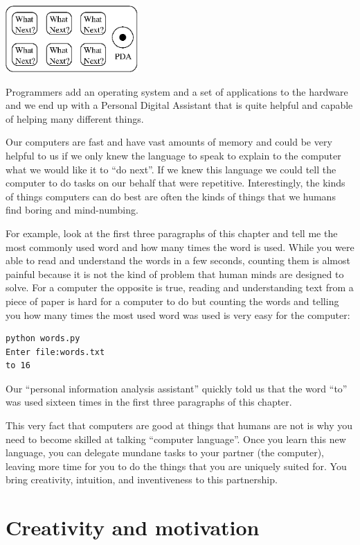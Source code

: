 \documentclass[11pt]{book}
\begin{document}
\beforefig
\centerline{\includegraphics[height=1.00in]{figs2/pda.eps}}
\afterfig

Programmers add an operating system and a set of applications
to the hardware and we end up with a Personal Digital
Assistant that is quite helpful and capable of helping
many different things.

Our computers are fast and have vast amounts of memory and 
could be very helpful to us if we only knew the language to
speak to explain to the computer what we would like it to 
``do next''.  If we knew this language we could tell the 
computer to do tasks on our behalf that were repetitive.  
Interestingly, the kinds of things computers can do best
are often the kinds of things that we humans find boring
and mind-numbing.

For example, look at the first three paragraphs of this
chapter and tell me the most commonly used word and how
many times the word is used.  While you were able to read
and understand the words in a few seconds, counting them
is almost painful because it is not the kind of problem 
that human minds are designed to solve.  For a computer
the opposite is true, reading and understanding text 
from a piece of paper is hard for a computer to do 
but counting the words and telling you how many times
the most used word was used is very easy for the
computer:

\beforeverb
\begin{verbatim}
python words.py
Enter file:words.txt
to 16
\end{verbatim}
\afterverb
%
Our ``personal information analysis assistant'' quickly 
told us that the word ``to'' was used sixteen times in the
first three paragraphs of this chapter.

This very fact that computers are good at things 
that humans are not is why you need to become
skilled at talking ``computer language''.  Once you learn
this new language, you can delegate mundane tasks
to your partner (the computer), leaving more time 
for you to do the 
things that you are uniquely suited for.  You bring 
creativity, intuition, and inventiveness to this
partnership.  

\section{Creativity and motivation}
\end{document}
